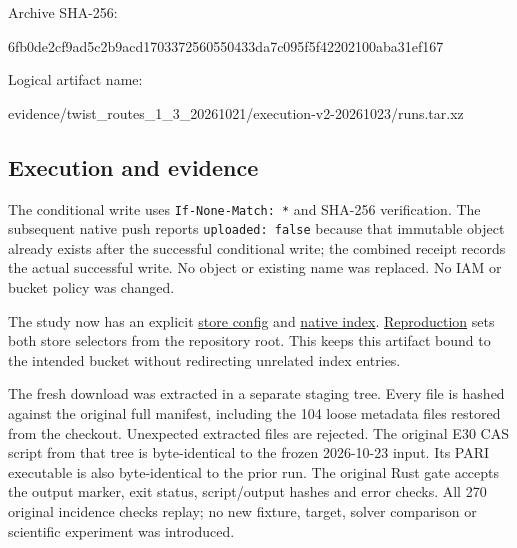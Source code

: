 \documentclass[
  10pt,
]{article}
\newenvironment{Shaded}{}{}
\newcommand{\NormalTok}[1]{#1}
\begin{document}
Archive SHA-256:

\begin{Shaded}
\begin{Highlighting}[]
\NormalTok{6fb0de2cf9ad5c2b9acd1703372560550433da7c095f5f42202100aba31ef167}
\end{Highlighting}
\end{Shaded}

Logical artifact name:

\begin{Shaded}
\begin{Highlighting}[]
\NormalTok{evidence/twist\_routes\_1\_3\_20261021/execution{-}v2{-}20261023/runs.tar.xz}
\end{Highlighting}
\end{Shaded}



\subsection{Execution and evidence}\label{execution-and-evidence}

The conditional write uses \texttt{If-None-Match:\ *} and SHA-256
verification. The subsequent native push reports
\texttt{uploaded:\ false} because that immutable object already exists
after the successful conditional write; the combined receipt records the
actual successful write. No object or existing name was replaced. No IAM
or bucket policy was changed.

The study now has an explicit \href{../../store/config.json}{store
config} and \href{../../store/index.json}{native index}.
\href{../../store/README.md}{Reproduction} sets both store selectors
from the repository root. This keeps this artifact bound to the intended
bucket without redirecting unrelated index entries.

The fresh download was extracted in a separate staging tree. Every file
is hashed against the original full manifest, including the 104 loose
metadata files restored from the checkout. Unexpected extracted files
are rejected. The original E30 CAS script from that tree is
byte-identical to the frozen 2026-10-23 input. Its PARI executable is
also byte-identical to the prior run. The original Rust gate accepts the
output marker, exit status, script/output hashes and error checks. All
270 original incidence checks replay; no new fixture, target, solver
comparison or scientific experiment was introduced.
\end{document}

